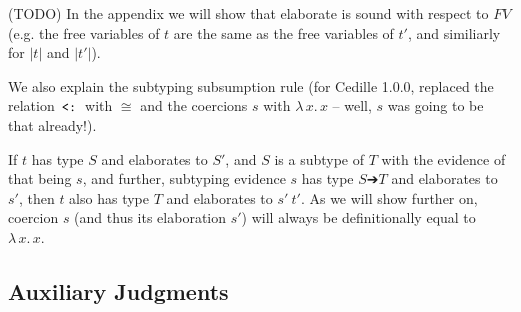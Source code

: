 \documentclass{article}
\newcommand{\absu}[3]{{#1}\, #2.\, #3}
\newcommand{\les}{\texttt{\,<:\,}}
\begin{document}
\begin{itemize}
\begin{itemize}
    (TODO) In the appendix we will show that elaborate is sound with respect to
    $FV$ (e.g. the free variables of $t$ are the same as the free variables of
    $t'$, and similiarly for $|t|$ and $|t'|$).
  \end{itemize}

  We also explain the subtyping subsumption rule (for Cedille 1.0.0, replaced
  the relation $\les$ with $\cong$ and the coercions $s$ with $\absu{λ}{x}{x}$
  -- well, $s$ was going to be that already!).

  If $t$ has type $S$ and elaborates to $S'$, and $S$ is a subtype of $T$ with
  the evidence of that being $s$, and further, subtyping evidence $s$ has type
  $S ➔ T$ and elaborates to $s'$, then $t$ also has type $T$ and elaborates to
  $s'\ t'$. As we will show further on, coercion $s$ (and thus its elaboration
  $s'$) will always be definitionally equal to $\absu{λ}{x}{x}$.
\end{itemize}

\subsection{Auxiliary Judgments}
\end{document}
